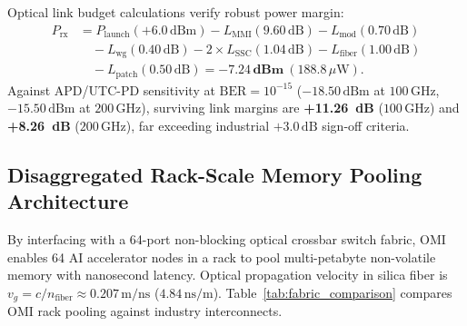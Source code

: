 \documentclass[journal]{IEEEtran}
\begin{document}
Optical link budget calculations verify robust power margin:
\begin{align}
    P_{\text{rx}} &= P_{\text{launch}} (+6.0\,\text{dBm}) - L_{\text{MMI}} (9.60\,\text{dB}) - L_{\text{mod}} (0.70\,\text{dB}) \nonumber \\
    &\quad - L_{\text{wg}} (0.40\,\text{dB}) - 2 \times L_{\text{SSC}} (1.04\,\text{dB}) - L_{\text{fiber}} (1.00\,\text{dB}) \nonumber \\
    &\quad - L_{\text{patch}} (0.50\,\text{dB}) = \mathbf{-7.24\,\text{dBm}} \ (188.8\,\mu\text{W}).
\end{align}
Against APD/UTC-PD sensitivity at $\text{BER} = 10^{-15}$ ($-18.50\,\text{dBm}$ at $100\,\text{GHz}$, $-15.50\,\text{dBm}$ at $200\,\text{GHz}$), surviving link margins are \textbf{+11.26~dB} ($100\,\text{GHz}$) and \textbf{+8.26~dB} ($200\,\text{GHz}$), far exceeding industrial $+3.0\,\text{dB}$ sign-off criteria.

\subsection{Disaggregated Rack-Scale Memory Pooling Architecture}
By interfacing with a 64-port non-blocking optical crossbar switch fabric, OMI enables 64 AI accelerator nodes in a rack to pool multi-petabyte non-volatile memory with nanosecond latency. Optical propagation velocity in silica fiber is $v_g = c / n_{\text{fiber}} \approx 0.207\,\text{m/ns}$ ($4.84\,\text{ns/m}$). Table~\ref{tab:fabric_comparison} compares OMI rack pooling against industry interconnects.

\begin{table}[!t]
\centering
\caption{Disaggregated Memory Fabric Latency and Throughput Comparison}
\label{tab:fabric_comparison}
\end{table}
\end{document}
